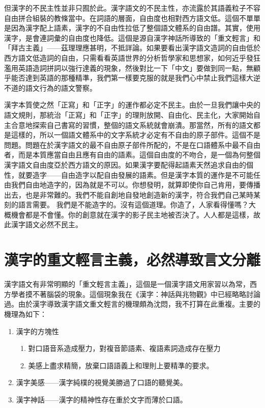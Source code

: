 \documentclass[a5paper, 10pt, openany]{book} %
\begin{document}
但漢字的不民主性並非只囿於此。漢字語文的不民主性，亦流露於其語義粒子不容自由拼合組裝的教條當中。在詞語的層面，自由度也相對西方語文低。這個不單單是因為漢字配上語素，漢字的不自由性拉低了整個語文體系的自由譜。其實，使用漢字，是會連詞彙的自由度也降低。這個是源自漢字神話所導致的「重文輕言」和「拜古主義」——茲理理應甚明，不抵詳論。如果要看出漢字語文造詞的自由低於西方語文低造詞的自由，只需看看英語世界的分析哲學家和思想家，如何近乎發狂濫用英語造詞拼詞以強行達義的現象，然後對比一下「中文」要做到同一點，無顧乎能否達到英語的那種精準，我們第一樣要克服的就是我們心中禁止我們這樣大逆不道的語文行為的語文警察。

漢字本質使之然「正寫」和「正字」的運作都必定不民主。由於一旦我們讓中央的語文規則，那統治「正寫」和「正字」的理則放開、自由化、民主化，大家開始自主合意地探索自己書寫的習慣，整個的語文系統就會崩潰。那當然，所有的語文都是這樣的，所以一個語文體系中的文字系統才必定有不自由的原子部件。這個不是問題。問題在於漢字語文的最不自由原子部件所配的，不是在口語體系中最不自由者，而是本質應當自由且應有自由的語素。這個自由度的不吻合，是一個為何整個漢字語文自由度亞於西方語文的原因。如果漢字要配得起語素天然追求自由的個性，就要造字——自由造字以配自由發展的語素。但是漢字本質的運作是不可能任由我們自由地造字的，因為就是不可以。你想發明，就算即使你自己肯用，要傳播出去，也是非常難的。我們不能自創地自發地創造新的漢字，符合我們自己某時某刻的語言需要。 我們是不能造字的。沒有這個道理。你造了，人家看得懂嗎？大概機會都是不會懂。你的創意就在漢字的影子民主地被否決了。人人都是這樣，故此漢字語文必然不民主。

\section{漢字的重文輕言主義，必然導致言文分離}

漢字語文有非常明顯的「重文輕言主義」，這個是一個漢字語文用家習以為常，西方學者摸不著腦袋的現象。這個現象我在《漢字：神話與兆物觀》中已經略略討論過。由於漢字導致漢字語文重文輕言的機理頗為沈悶，我不打算在此重複。主要的機理為如下：

\begin{enumerate}
  \item 漢字的方塊性
    \begin{enumerate}
      \item 對口語音系造成壓力，對複音節語素、複語素詞造成存在壓力
      \item 美感上盡求精簡，放棄口語語義上和理則上要精準的要求。
    \end{enumerate}
  \item 漢字美感——漢字純樸的視覺美勝過了口語的聽覺美。
  \item 漢字神話——漢字的精神性存在重於文字而薄於口語。
\end{enumerate}
\end{document}
